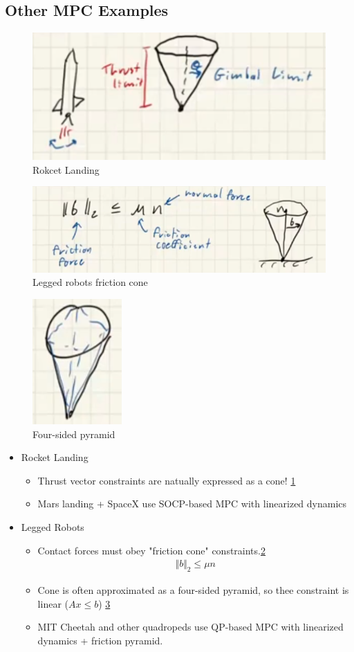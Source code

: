 
\subsection{Other MPC Examples}
\begin{figure}
    \centering
    \includegraphics[width=0.4\linewidth]{L8_Images/F3.PNG}
    \caption{Rokcet Landing}
    \label{fig:l8f3}
\end{figure}
\begin{figure}
    \centering
    \includegraphics[width=0.4\linewidth]{L8_Images/F4.PNG}
    \caption{Legged robots friction cone}
    \label{fig:l8f4}
\end{figure}

\begin{figure}
    \centering
    \includegraphics[width=0.2\linewidth]{L8_Images/F5.PNG}
    \caption{Four-sided pyramid}
    \label{fig:l8f5}
\end{figure}

\begin{itemize}
    \item Rocket Landing
    \begin{itemize}
        \item Thrust vector constraints are natually expressed as a cone! \cref{fig:l8f3}
        \item Mars landing + SpaceX use SOCP-based MPC with linearized dynamics
    \end{itemize}
    \item Legged Robots
    \begin{itemize}
        \item Contact forces must obey "friction cone" constraints.\cref{fig:l8f4}
        \begin{align}
            \Vert b \Vert_2 \leq \mu n
        \end{align}
        \item Cone is often approximated as a four-sided pyramid, so thee constraint is linear ($Ax \leq b$) \cref{fig:l8f5}
        \item MIT Cheetah and other quadropeds use QP-based MPC with linearized dynamics + friction pyramid.
    \end{itemize}
\end{itemize}

